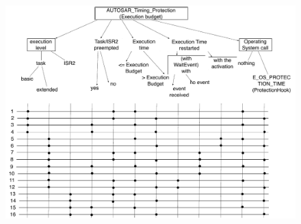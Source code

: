 \documentclass[10pt]{article}
\begin{document}
	\begin{figure}[htbp] %
  		\centering
		\includegraphics[width=1\textwidth]{graphics/AUTOSAR_Timing_Protection_Execution_Budget.pdf}
	\end{figure}
	
\end{document}
